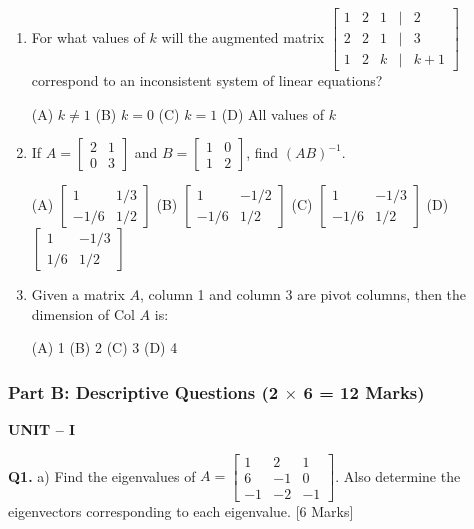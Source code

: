 \documentclass[11pt,a4paper]{article}
\begin{document}
\begin{enumerate}
\item For what values of $k$ will the augmented matrix 
$\begin{bmatrix} 1 & 2 & 1 & | & 2 \\ 2 & 2 & 1 & | & 3 \\ 1 & 2 & k & | & k+1 \end{bmatrix}$
correspond to an inconsistent system of linear equations?

(A) $k \neq 1$ \quad (B) $k = 0$ \quad (C) $k = 1$ \quad (D) All values of $k$

\item If $A = \begin{bmatrix} 2 & 1 \\ 0 & 3 \end{bmatrix}$ and $B = \begin{bmatrix} 1 & 0 \\ 1 & 2 \end{bmatrix}$, find $(AB)^{-1}$.

(A) $\begin{bmatrix} 1 & 1/3 \\ -1/6 & 1/2 \end{bmatrix}$ \quad 
(B) $\begin{bmatrix} 1 & -1/2 \\ -1/6 & 1/2 \end{bmatrix}$ \quad 
(C) $\begin{bmatrix} 1 & -1/3 \\ -1/6 & 1/2 \end{bmatrix}$ \quad 
(D) $\begin{bmatrix} 1 & -1/3 \\ 1/6 & 1/2 \end{bmatrix}$

\item Given a matrix $A$, column 1 and column 3 are pivot columns, then the dimension of Col $A$ is:

(A) 1 \quad (B) 2 \quad (C) 3 \quad (D) 4
\end{enumerate}

\subsubsection*{Part B: Descriptive Questions (2 $\times$ 6 = 12 Marks)}

\textbf{UNIT -- I}

\textbf{Q1.} a) Find the eigenvalues of $A = \begin{bmatrix} 1 & 2 & 1 \\ 6 & -1 & 0 \\ -1 & -2 & -1 \end{bmatrix}$. Also determine the eigenvectors corresponding to each eigenvalue. \hfill [6 Marks]
\end{document}
